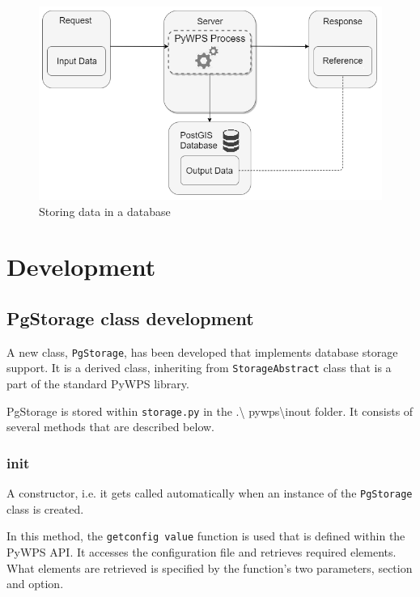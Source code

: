 \begin{figure}[H] \centering
      \includegraphics[width=350pt]{./pictures/newoption.png}
      \caption[Storing data in a database]{Storing data in a database}
      \label{fig:newoption}
  \end{figure}




\section{Development} 

\subsection{PgStorage class development} 

A new class, \texttt{PgStorage}, has been developed that implements
database storage support. It is a derived class, inheriting from
\texttt{StorageAbstract} class that is a part of the standard PyWPS
library.

PgStorage is stored within \texttt{storage.py} in the .\textbackslash
pywps\textbackslash inout folder. It consists of several methods that
are described below.

\subsubsection{\textunderscore \textunderscore init\textunderscore \textunderscore } 
A constructor, i.e. it gets called automatically when an instance of
the \texttt{PgStorage} class is created.

In this method, the \texttt{get\textunderscore config\textunderscore
  value} function is used that is defined within the PyWPS API. It
accesses the configuration file and retrieves required elements. What
elements are retrieved is specified by the function's two parameters,
section and option.

